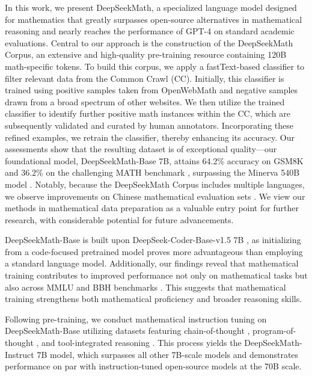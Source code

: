 In this work, we present DeepSeekMath, a specialized language model designed for mathematics that greatly surpasses open-source alternatives in mathematical reasoning and nearly reaches the performance of GPT-4 on standard academic evaluations. Central to our approach is the construction of the DeepSeekMath Corpus, an extensive and high-quality pre-training resource containing 120B math-specific tokens. To build this corpus, we apply a fastText-based classifier \citep{joulin2016fasttext} to filter relevant data from the Common Crawl (CC). Initially, this classifier is trained using positive samples taken from OpenWebMath \citep{openwebmath} and negative samples drawn from a broad spectrum of other websites. We then utilize the trained classifier to identify further positive math instances within the CC, which are subsequently validated and curated by human annotators. Incorporating these refined examples, we retrain the classifier, thereby enhancing its accuracy. Our assessments show that the resulting dataset is of exceptional quality—our foundational model, DeepSeekMath-Base 7B, attains 64.2\% accuracy on GSM8K \citep{gsm8k} and 36.2\% on the challenging MATH benchmark \citep{MATH}, surpassing the Minerva 540B model \citep{minerva}. Notably, because the DeepSeekMath Corpus includes multiple languages, we observe improvements on Chinese mathematical evaluation sets \citep{wei2023cmath,agieval}. We view our methods in mathematical data preparation as a valuable entry point for further research, with considerable potential for future advancements.

DeepSeekMath-Base is built upon DeepSeek-Coder-Base-v1.5 7B \citep{deepseek-coder}, as initializing from a code-focused pretrained model proves more advantageous than employing a standard language model. Additionally, our findings reveal that mathematical training contributes to improved performance not only on mathematical tasks but also across MMLU \citep{mmlu} and BBH benchmarks \citep{bbh}. This suggests that mathematical training strengthens both mathematical proficiency and broader reasoning skills.

Following pre-training, we conduct mathematical instruction tuning on DeepSeekMath-Base utilizing datasets featuring chain-of-thought \citep{cot}, program-of-thought \citep{pot,pal}, and tool-integrated reasoning \citep{tora}. This process yields the DeepSeekMath-Instruct 7B model, which surpasses all other 7B-scale models and demonstrates performance on par with instruction-tuned open-source models at the 70B scale.

